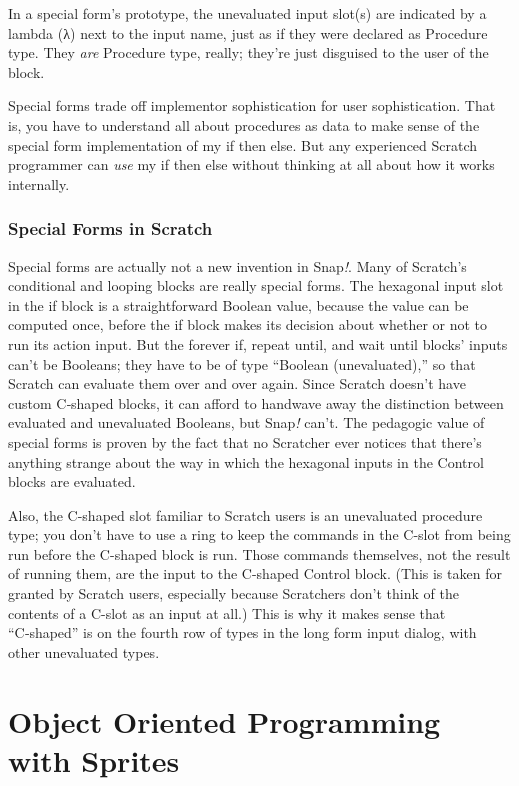 In a special form's prototype, the unevaluated input slot(s) are
indicated by a lambda (λ) next to the input name, just as if they were
declared as Procedure type. They \emph{are} Procedure type, really;
they're just disguised to the user of the block.

Special forms trade off implementor sophistication for user
sophistication. That is, you have to understand all about procedures as
data to make sense of the special form implementation of my if then
else. But any experienced Scratch programmer can \emph{use} my if then
else without thinking at all about how it works internally.

\subsubsection{Special Forms in Scratch}\label{special-forms-in-scratch}

Special forms are actually not a new invention in Snap\emph{!}. Many of
Scratch's conditional and looping blocks are really special forms. The
hexagonal input slot in the if block is a straightforward Boolean value,
because the value can be computed once, before the if block makes its
decision about whether or not to run its action input. But the forever
if, repeat until, and wait until blocks' inputs can't be Booleans; they
have to be of type ``Boolean (unevaluated),'' so that Scratch can
evaluate them over and over again. Since Scratch doesn't have custom
C‑shaped blocks, it can afford to handwave away the distinction between
evaluated and unevaluated Booleans, but Snap\emph{!} can't. The
pedagogic value of special forms is proven by the fact that no Scratcher
ever notices that there's anything strange about the way in which the
hexagonal inputs in the Control blocks are evaluated.

Also, the C-shaped slot familiar to Scratch users is an unevaluated
procedure type; you don't have to use a ring to keep the commands in the
C-slot from being run before the C-shaped block is run. Those commands
themselves, not the result of running them, are the input to the
C-shaped Control block. (This is taken for granted by Scratch users,
especially because Scratchers don't think of the contents of a C-slot as
an input at all.) This is why it makes sense that ``C‑shaped'' is on the
fourth row of types in the long form input dialog, with other
unevaluated types.

\section{\texorpdfstring{\hfill\break
Object Oriented Programming with
Sprites}{ Object Oriented Programming with Sprites}}\label{object-oriented-programming-with-sprites}

